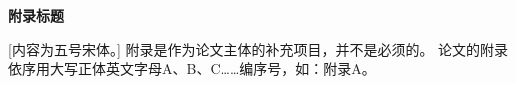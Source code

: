 \chapter[附录标题]{}
\begin{center}
	\bfseries 附录标题
\end{center}

[内容为五号宋体。] 附录是作为论文主体的补充项目，并不是必须的。
论文的附录依序用大写正体英文字母A、B、C……编序号，如：附录A。





